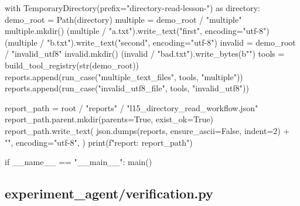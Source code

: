 \documentclass[UTF8,zihao=-4,fontset=fandol]{ctexart}
\begin{document}
\begin{Code}
    with TemporaryDirectory(prefix="directory-read-lesson-") as directory:
        demo_root = Path(directory)
        multiple = demo_root / "multiple"
        multiple.mkdir()
        (multiple / "a.txt").write_text("first", encoding="utf-8")
        (multiple / "b.txt").write_text("second", encoding="utf-8")
        invalid = demo_root / "invalid_utf8"
        invalid.mkdir()
        (invalid / "bad.txt").write_bytes(b"\xff\xfe")
        tools = build_tool_registry(str(demo_root))
        reports.append(run_case("multiple_text_files", tools, "multiple"))
        reports.append(run_case("invalid_utf8_file", tools, "invalid_utf8"))

    report_path = root / "reports" / "l15_directory_read_workflow.json"
    report_path.parent.mkdir(parents=True, exist_ok=True)
    report_path.write_text(
        json.dumps(reports, ensure_ascii=False, indent=2) + "\n", encoding="utf-8",
    )
    print(f"\nSaved report: {report_path}")


if __name__ == "__main__":
    main()
\end{Code}

\subsection{experiment\_agent/verification.py}
\end{document}
